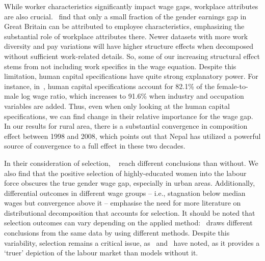 While worker characteristics significantly impact wage gaps, workplace attributes are also crucial.~\citet{Chatterji2011} find that only a small fraction of the gender earnings gap in Great Britain can be attributed to employee characteristics, emphasizing the substantial role of workplace attributes there. Newer datasets with more work diversity and pay variations will have higher structure effects when decomposed without sufficient work-related details. So, some of our increasing structural effect stems from not including work specifics in the wage equation. Despite this limitation, human capital specifications have quite strong explanatory power. For instance, in~\citet{Blau2017}, human capital specifications account for 82.1\% of the female-to-male log wage ratio, which increases to 91.6\% when industry and occupation variables are added. Thus, even when only looking at the human capital specifications, we can find change in their relative importance for the wage gap. In our results for rural area, there is a substantial convergence in composition effect between 1998 and 2008, which points out that Nepal has utilized a powerful source of convergence to a full effect in these two decades.\par

In their consideration of selection, ~\citet{Maasoumi2019} reach different conclusions than without. We also find that the positive selection of highly-educated women into the labour force obscures the true gender wage gap, especially in urban areas. Additionally, differential outcomes in different wage groups -- i.e., stagnation below median wages but convergence above it -- emphasise the need for more literature on distributional decomposition that accounts for selection. It should be noted that selection outcomes can vary depending on the applied method:~\citet{Machado2017} draws different conclusions from the same data by using different methods. Despite this variability, selection remains a critical issue, as~\citet{Heckman1974} and~\citet{Gronau1974} have noted, as it provides a ‘truer’ depiction of the labour market than models without it.\par

